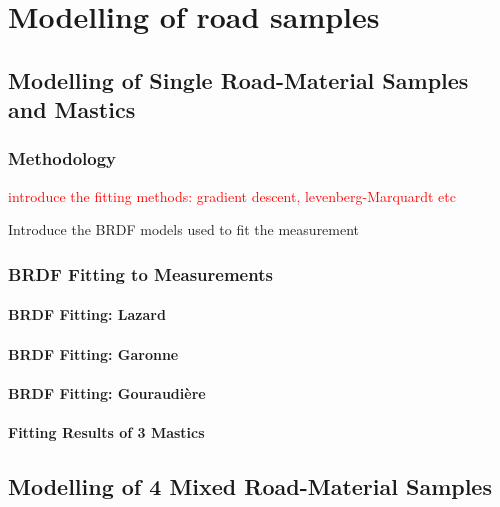 \chapter{Modelling of road samples}

\section{Modelling of Single Road-Material Samples and Mastics}

\subsection{Methodology}

\textcolor{red}{introduce the fitting methods: gradient descent, levenberg-Marquardt etc}

Introduce the BRDF models used to fit the measurement


\subsection{BRDF Fitting to Measurements}

\subsubsection{BRDF Fitting: Lazard}

\subsubsection{BRDF Fitting: Garonne}

\subsubsection{BRDF Fitting: Gouraudière}


\subsubsection{Fitting Results of 3 Mastics}


\section{Modelling of 4 Mixed Road-Material Samples}

